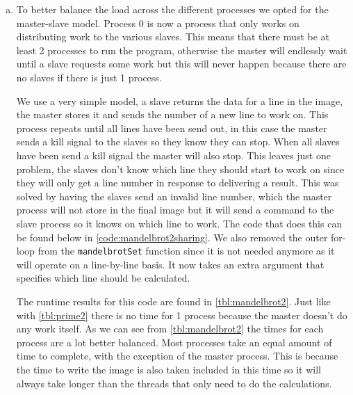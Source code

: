 \documentclass[a4paper]{article}
\begin{document}
\begin{enumerate}[(a)]
	\item To better balance the load across the different processes we opted for the master-slave model. Process 0 is now a process that only works on distributing work to the various slaves. This means that there must be at least 2 processes to run the program, otherwise the master will endlessly wait until a slave requests some work but this will never happen because there are no slaves if there is just 1 process.
	
	We use a very simple model, a slave returns the data for a line in the image, the master stores it and sends the number of a new line to work on. This process repeats until all lines have been send out, in this case the master sends a kill signal to the slaves so they know they can stop. When all slaves have been send a kill signal the master will also stop. This leaves just one problem, the slaves don't know which line they should start to work on since they will only get a line number in response to delivering a result. This was solved by having the slaves send an invalid line number, which the master process will not store in the final image but it will send a command to the slave process so it knows on which line to work. The code that does this can be found below in \autoref{code:mandelbrot2sharing}. We also removed the outer for-loop from the \texttt{mandelbrotSet} function since it is not needed anymore as it will operate on a line-by-line basis. It now takes an extra argument that specifies which line should be calculated.
	
	
	
	
	The runtime results for this code are found in \autoref{tbl:mandelbrot2}. Just like with \autoref*{tbl:prime2} there is no time for 1 process because the master doesn't do any work itself. As we can see from \autoref{tbl:mandelbrot2} the times for each process are a lot better balanced. Most processes take an equal amount of time to complete, with the exception of the master process. This is because the time to write the image is also taken included in this time so it will always take longer than the threads that only need to do the calculations.
\end{enumerate}
\end{document}

